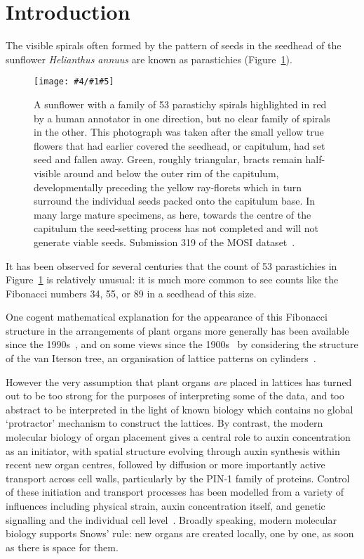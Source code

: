 \documentclass[a4paper,10pt]{amsart}
\newlength{\jfigwidth}
\newcommand{\jpgfig}[3]{\jdofig{#1}{#2}{#3}{Figures}{.jpg}}
\newcommand{\jdofig}[5]{
	\begin{figure}\centering\texttt{[image: \#4/\#1\#5]} \caption{#2}\label{fig:#1}\end{figure}
}
\begin{document}
 \section{Introduction}
The visible spirals often formed by the pattern of seeds in the seedhead of the sunflower \textit{Helianthus annuus} are known as parastichies (Figure~\ref{fig:319MOSIpaper}).
\jpgfig{319MOSIpaper}{A sunflower with a family of 53 parastichy spirals highlighted in red by a human annotator in one direction, but no clear family of spirals in the other. This photograph was taken after the small yellow true flowers that had earlier covered the seedhead, or capitulum, had set seed and fallen away.  Green, roughly triangular,  bracts remain half-visible around and below the outer rim of the capitulum, developmentally preceding the yellow ray-florets which in turn surround the individual seeds packed onto the capitulum base. In many large mature specimens, as here, towards the centre of the capitulum the seed-setting process has not completed and will not generate viable seeds. 
	Submission 319 of the MOSI dataset~\cite{swintonNovelFibonacciNonFibonacci2016}.}{1}
It has been observed for several centuries that the count of 53 parastichies in Figure~\ref{fig:319MOSIpaper} is relatively unusual: it is much more common to see counts like the Fibonacci numbers 34, 55, or 89 in a seedhead of this size. 

One cogent mathematical explanation for the appearance of this Fibonacci structure in the arrangements of plant organs more generally has been available since the 1990s~\cite{jeanSymmetryPlants1998}, and on some views since the 1900s~\cite{vanitersonjrMathematischeUndMikroscopischAnatomische1907} by considering the structure of the van Iterson tree, an organisation of lattice patterns on cylinders~\cite{godinPhyllotaxisGeometricCanalization2020,swintonMathematicalPhyllotaxis2023}. 

However the very assumption that plant organs \textit{are} placed in lattices has turned out to be too strong for the purposes of interpreting some of the data, and too abstract to be interpreted in the light of known biology which contains no global `protractor' mechanism to construct the lattices. 
By contrast, the modern molecular biology of organ placement gives a central role to auxin concentration as an initiator, with spatial structure evolving through auxin synthesis within recent new organ centres, followed by diffusion or more importantly active transport across cell walls, particularly by the PIN-1 family of proteins. Control of these initiation and transport processes has been modelled from a variety of influences including physical strain, auxin concentration itself, and genetic signalling and the individual cell level~\cite{godinPhyllotaxisGeometricCanalization2020}. Broadly speaking, modern molecular biology supports Snows' rule: new organs are created locally, one by one, as soon as there is space for them. 
\end{document}
